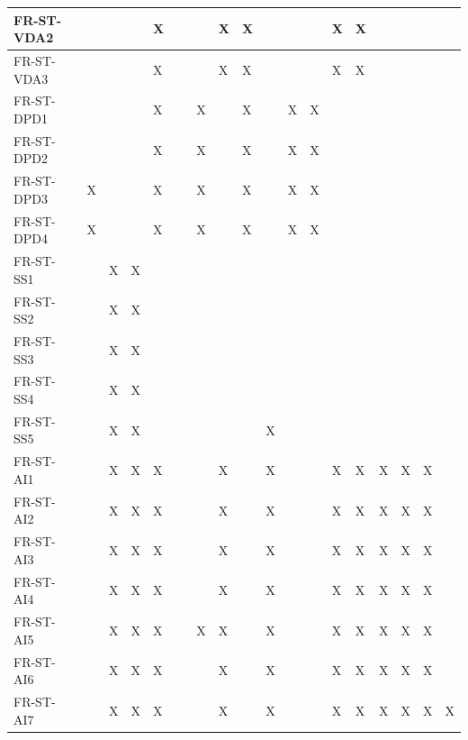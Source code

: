 \documentclass[12pt, titlepage]{article}
\begin{document}
\begin{table}[!ht]
{\begin{tabular}{|l|l|l|l|l|l|l|l|l|l|l|l|l|l|l|l|l|l|}
      FR-ST-VDA2 & ~ & ~ & ~ & X & ~ & ~ & X & X & ~ & ~ & ~ & X & X & ~ & ~ & ~ & ~ \\ \hline
      FR-ST-VDA3 & ~ & ~ & ~ & X & ~ & ~ & X & X & ~ & ~ & ~ & X & X & ~ & ~ & ~ & ~ \\ \hline
      FR-ST-DPD1 & ~ & ~ & ~ & X & ~ & X & ~ & X & ~ & X & X & ~ & ~ & ~ & ~ & ~ & ~ \\ \hline
      FR-ST-DPD2 & ~ & ~ & ~ & X & ~ & X & ~ & X & ~ & X & X & ~ & ~ & ~ & ~ & ~ & ~ \\ \hline
      FR-ST-DPD3 & X & ~ & ~ & X & ~ & X & ~ & X & ~ & X & X & ~ & ~ & ~ & ~ & ~ & ~ \\ \hline
      FR-ST-DPD4 & X & ~ & ~ & X & ~ & X & ~ & X & ~ & X & X & ~ & ~ & ~ & ~ & ~ & ~ \\ \hline
      FR-ST-SS1 & ~ & X & X & ~ & ~ & ~ & ~ & ~ & ~ & ~ & ~ & ~ & ~ & ~ & ~ & ~ & ~ \\ \hline
      FR-ST-SS2 & ~ & X & X & ~ & ~ & ~ & ~ & ~ & ~ & ~ & ~ & ~ & ~ & ~ & ~ & ~ & ~ \\ \hline
      FR-ST-SS3 & ~ & X & X & ~ & ~ & ~ & ~ & ~ & ~ & ~ & ~ & ~ & ~ & ~ & ~ & ~ & ~ \\ \hline
      FR-ST-SS4 & ~ & X & X & ~ & ~ & ~ & ~ & ~ & ~ & ~ & ~ & ~ & ~ & ~ & ~ & ~ & ~ \\ \hline
      FR-ST-SS5 & ~ & X & X & ~ & ~ & ~ & ~ & ~ & X & ~ & ~ & ~ & ~ & ~ & ~ & ~ & ~ \\ \hline
      FR-ST-AI1 & ~ & X & X & X & ~ & ~ & X & ~ & X & ~ & ~ & X & X & X & X & X & ~ \\ \hline
      FR-ST-AI2 & ~ & X & X & X & ~ & ~ & X & ~ & X & ~ & ~ & X & X & X & X & X & ~ \\ \hline
      FR-ST-AI3 & ~ & X & X & X & ~ & ~ & X & ~ & X & ~ & ~ & X & X & X & X & X & ~ \\ \hline
      FR-ST-AI4 & ~ & X & X & X & ~ & ~ & X & ~ & X & ~ & ~ & X & X & X & X & X & ~ \\ \hline
      FR-ST-AI5 & ~ & X & X & X & ~ & X & X & ~ & X & ~ & ~ & X & X & X & X & X & ~ \\ \hline
      FR-ST-AI6 & ~ & X & X & X & ~ & ~ & X & ~ & X & ~ & ~ & X & X & X & X & X & ~ \\ \hline
      FR-ST-AI7 & ~ & X & X & X & ~ & ~ & X & ~ & X & ~ & ~ & X & X & X & X & X & X \\ \hline
  \end{tabular}
  }
\end{table}

\newpage
\end{document}
